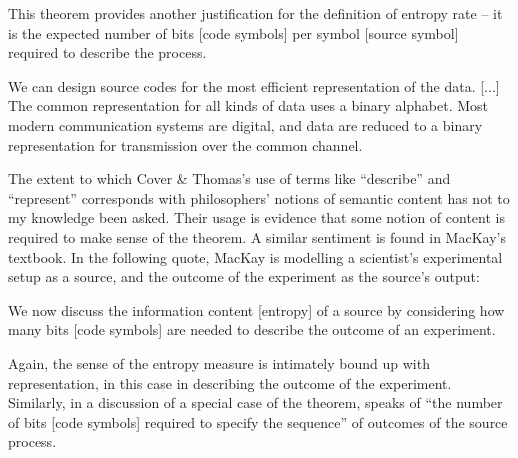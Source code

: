\begin{myquote}
This theorem provides another justification for the definition of entropy rate -- it is the expected number of bits [code symbols] per symbol [source symbol] required to describe the process.
\par\hspace*{\fill}\citet[115]{cover2006elements}
\end{myquote}

\begin{myquote}
We can design source codes for the most efficient representation of the data. [...] The common representation for all kinds of data uses a binary alphabet. Most modern communication systems are digital, and data are reduced to a binary representation for transmission over the common channel.
\par\hspace*{\fill}\citet[218]{cover2006elements}
\end{myquote}

\noindent The extent to which Cover \& Thomas's use of terms like ``describe'' and ``represent'' corresponds with philosophers' notions of semantic content has not to my knowledge been asked.
Their usage is evidence that some notion of content is required to make sense of the theorem.
A similar sentiment is found in MacKay's textbook.
In the following quote, MacKay is modelling a scientist's experimental setup as a source, and the outcome of the experiment as the source's output:

\begin{myquote}
We now discuss the information content [entropy] of a source by considering how many bits [code symbols] are needed to describe the outcome of an experiment.
\par\hspace*{\fill}\citet[73]{mackay2003information}
\end{myquote}

\noindent Again, the sense of the entropy measure is intimately bound up with representation, in this case in describing the outcome of the experiment.
Similarly, in a discussion of a special case of the theorem, \citet[397]{shannon1948mathematicalc} speaks of ``the number of bits [code symbols] required to specify the sequence'' of outcomes of the source process.

